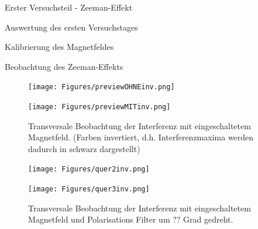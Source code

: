 \documentclass[pdftex, a4paper,11pt, twoside, ngerman]{report}
\begin{document}
\begin{chapter}{Erster Versuchsteil - Zeeman-Effekt}
\begin{section}{Auswertung des ersten Versuchstages}
\begin{subsection}{Kalibrierung des Magnetfeldes}
      \end{subsection}
      
      
      
      \begin{subsection}{Beobachtung des Zeeman-Effekts}
        \label{chp:Zeeman:sec:AuswertungBeobachtung}
        
        \begin{figure}[ht]
          \centering
          \begin{minipage}{0.48\textwidth}
            \centering
            \texttt{[image: Figures/previewOHNEinv.png]}
            \caption{Transversale Beobachtung der Interferenz ohne externes 
                Magnetfeld. (Farben invertiert, d.h. Interferenzmaxima werden 
                dadurch in schwarz dargestellt)}
            \label{fig:previewOHNEinv}
          \end{minipage}\quad
          \begin{minipage}{0.48\textwidth}
            \centering
            \texttt{[image: Figures/previewMITinv.png]}
            \caption{Transversale Beobachtung der Interferenz mit 
                eingeschaltetem Magnetfeld. (Farben invertiert, d.h. 
                Interferenzmaxima werden dadurch in schwarz dargestellt)}
            \label{fig:previewMITinv}
          \end{minipage}
        \end{figure}
        
        
        
        \begin{figure}[ht]
          \centering
          \begin{minipage}{0.48\textwidth}
            \centering
            \texttt{[image: Figures/quer2inv.png]}
            \caption{Transversale Beobachtung der Interferenz mit 
                eingeschaltetem Magnetfeld und Polarisations Filter um ?? Grad
                gedreht.}
            \label{fig:quer2inv}
          \end{minipage}\quad
          \begin{minipage}{0.48\textwidth}
            \centering
            \texttt{[image: Figures/quer3inv.png]}
            \caption{Transversale Beobachtung der Interferenz mit 
                eingeschaltetem Magnetfeld und Polarisations Filter um ?? Grad
                gedreht.}
            \label{fig:quer3inv}
          \end{minipage}
        \end{figure}
        

\end{subsection}
\end{section}
\end{chapter}
\end{document}
